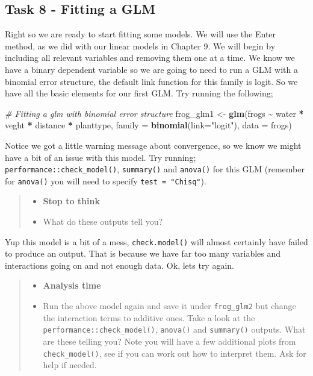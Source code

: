 \documentclass[
]{book}
\newenvironment{Shaded}{\begin{snugshade}}{\end{snugshade}}
\newcommand{\AttributeTok}[1]{\textcolor[rgb]{0.13,0.29,0.53}{#1}}
\newcommand{\CommentTok}[1]{\textcolor[rgb]{0.56,0.35,0.01}{\textit{#1}}}
\newcommand{\FunctionTok}[1]{\textcolor[rgb]{0.13,0.29,0.53}{\textbf{#1}}}
\newcommand{\NormalTok}[1]{#1}
\newcommand{\OtherTok}[1]{\textcolor[rgb]{0.56,0.35,0.01}{#1}}
\newcommand{\SpecialCharTok}[1]{\textcolor[rgb]{0.81,0.36,0.00}{\textbf{#1}}}
\newcommand{\StringTok}[1]{\textcolor[rgb]{0.31,0.60,0.02}{#1}}
\providecommand{\tightlist}{%
  \setlength{\itemsep}{0pt}\setlength{\parskip}{0pt}}
\begin{document}
\subsection{Task 8 - Fitting a GLM}\label{task-8---fitting-a-glm}

Right so we are ready to start fitting some models. We will use the Enter method, as we did with our linear models in Chapter 9. We will begin by including all relevant variables and removing them one at a time. We know we have a binary dependent variable so we are going to need to run a GLM with a binomial error structure, the default link function for this family is logit. So we have all the basic elements for our first GLM. Try running the following;

\begin{Shaded}
\begin{Highlighting}[]
\CommentTok{\# Fitting a glm with binomial error structure}
\NormalTok{frog\_glm1 }\OtherTok{\textless{}{-}} \FunctionTok{glm}\NormalTok{(frogs }\SpecialCharTok{\textasciitilde{}}\NormalTok{ water }\SpecialCharTok{*}\NormalTok{ veght }\SpecialCharTok{*}\NormalTok{ distance }\SpecialCharTok{*}\NormalTok{ planttype,}
                 \AttributeTok{family =} \FunctionTok{binomial}\NormalTok{(}\AttributeTok{link=}\StringTok{"logit"}\NormalTok{),}
                 \AttributeTok{data =}\NormalTok{ frogs)}
\end{Highlighting}
\end{Shaded}

Notice we got a little warning message about convergence, so we know we might have a bit of an issue with this model. Try running; \texttt{performance::check\_model()}, \texttt{summary()} and \texttt{anova()} for this GLM (remember for \texttt{anova()} you will need to specify \texttt{test\ =\ "Chisq"}).

\begin{quote}
\begin{itemize}
\tightlist
\item
  \textbf{Stop to think}
\item
  What do these outputs tell you?
\end{itemize}
\end{quote}

Yup this model is a bit of a mess, \texttt{check.model()} will almost certainly have failed to produce an output. That is because we have far too many variables and interactions going on and not enough data. Ok, lets try again.

\begin{quote}
\begin{itemize}
\tightlist
\item
  \textbf{Analysis time}
\item
  Run the above model again and save it under \texttt{frog\_glm2} but change the interaction terms to additive ones. Take a look at the \texttt{performance::check\_model()}, \texttt{anova()} and \texttt{summary()} outputs. What are these telling you? Note you will have a few additional plots from \texttt{check\_model()}, see if you can work out how to interpret them. Ask for help if needed.
\end{itemize}
\end{quote}
\end{document}
